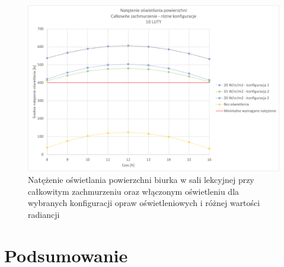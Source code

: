 \documentclass[a4paper,12pt]{article}
\begin{document}
	\begin{figure}[!ht]
		\centering
		\includegraphics[width=\linewidth]{Wykresy/oswietlenie_calkowite_zachmurzenie_rozne_konfiguracje.pdf}
		\caption{Natężenie oświetlania powierzchni biurka w sali lekcyjnej przy całkowitym zachmurzeniu  oraz włączonym oświetleniu dla wybranych konfiguracji opraw oświetleniowych i różnej wartości radiancji}
		\label{oswietlenie_calkowite_zachmurzenie_rozne_konfiguracje}
	\end{figure}	

	
	\newpage
	\section{Podsumowanie}
	\label{sec:podsumowanie}		
\end{document}
